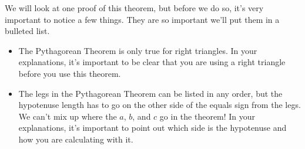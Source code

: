 \documentclass{ximera}
\begin{document}
We will look at one proof of this theorem, but before we do so, it's very important to notice a few things. They are so important we'll put them in a bulleted list.
\begin{itemize}
	\item The Pythagorean Theorem is only true for right triangles. In your explanations, it's important to be clear that you are using a right triangle before you use this theorem.
	\item The legs in the Pythagorean Theorem can be listed in any order, but the hypotenuse length has to go on the other side of the equals sign from the legs. We can't mix up where the $a$, $b$, and $c$ go in the theorem! In your explanations, it's important to point out which side is the hypotenuse and how you are calculating with it.
\end{itemize}
\end{document}
